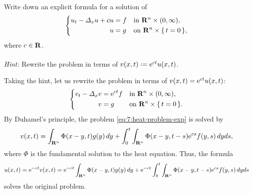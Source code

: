 \begin{problem}
  Write down an explicit formula for a solution of
  \[
    \left\{
      \begin{aligned}
        u_t-\Lap_x u+cu&=f&&\text{in \(\R^n\times(0,\infty)\),}\\
        u&=g&&\text{on \(\R^n\times\{\,t=0\,\}\),}
      \end{aligned}
    \right.
  \]
  where \(c\in\mathbf{R}\).
  \\\\
  \emph{Hint:} Rewrite the problem in terms of
  \(v(x,t)\defeq\rme^{ct}u(x,t)\).
\end{problem}
\begin{solution*}
  Taking the hint, let us rewrite the problem in terms of
  \(v(x,t)=\mathrm{e}^{ct}u(x,t)\):
  \begin{equation}
    \label{eq:7:heat-problem-exp}
    \left\{
      \begin{aligned}
        v_t-\Lap_xv&=\rme^{ct}f&&\text{in
          \(\R^n\times(0,\infty),\)}\\
        v&=g&&\text{on \(\R^n\times\{\,t=0\,\}\).}
      \end{aligned}
    \right.
  \end{equation}
  By Duhamel's principle, the problem \eqref{eq:7:heat-problem-exp} is
  solved by
  \[
    v(x,t)=\int_{\R^n}\Phi(x-y,t)g(y)\diff y
    +\int_0^t\int_{\R^n}\Phi(x-y,t-s)\rme^{cs}f(y,s)\diff yds,
  \]
  where \(\Phi\) is the fundamental solution to the heat equation. Thus,
  the formula
  \[
    u(x,t)=\rme^{-ct}v(x,t)=\rme^{-ct}\int_{\R^n}\Phi(x-y,t)g(y)\diff y
    +\rme^{-ct}\int_0^t\int_{\R^n}\Phi(x-y,t-s)\rme^{cs}f(y,s)\diff yds
  \]
  solves the original problem.
\end{solution*}

